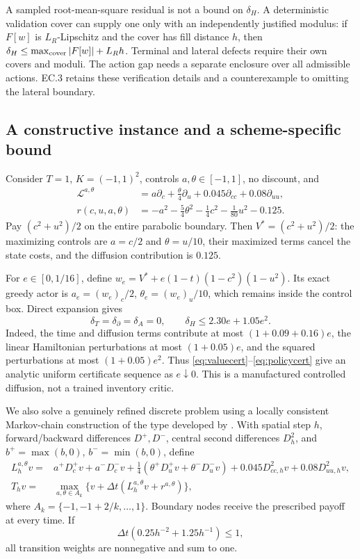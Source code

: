 A sampled root-mean-square residual is not a bound on $\delta_H$. A deterministic validation cover can supply one only with an independently justified modulus: if $F[w]$ is $L_R$-Lipschitz and the cover has fill distance $h$, then $\delta_H\leq\max_{\rm cover}|F[w]|+L_Rh$. Terminal and lateral defects require their own covers and moduli. The action gap needs a separate enclosure over all admissible actions. EC.3 retains these verification details and a counterexample to omitting the lateral boundary.

\subsection{A constructive instance and a scheme-specific bound}\label{sec:pde}
Consider $T=1$, $K=(-1,1)^2$, controls $a,\theta\in[-1,1]$, no discount, and
\begin{align}
 \mathcal L^{a,\theta}&=a\partial_c+\tfrac\theta4\partial_u
                     +0.045\partial_{cc}+0.08\partial_{uu},\label{eq:generator}\\
 r(c,u,a,\theta)&=-a^2-\tfrac54\theta^2-\tfrac14c^2-\tfrac1{80}u^2-0.125.\label{eq:pder}
\end{align}
Pay $(c^2+u^2)/2$ on the entire parabolic boundary. Then $V^*=(c^2+u^2)/2$: the maximizing controls are $a=c/2$ and $\theta=u/10$, their maximized terms cancel the state costs, and the diffusion contribution is $0.125$.

For $e\in[0,1/16]$, define $w_e=V^*+e(1-t)(1-c^2)(1-u^2)$. Its exact greedy actor is $a_e=(w_e)_c/2$, $\theta_e=(w_e)_u/10$, which remains inside the control box. Direct expansion gives
\begin{equation}\label{eq:analytic}
 \delta_T=\delta_\partial=\delta_A=0,\qquad
 \delta_H\leq2.30e+1.05e^2.
\end{equation}
Indeed, the time and diffusion terms contribute at most $(1+0.09+0.16)e$, the linear Hamiltonian perturbations at most $(1+0.05)e$, and the squared perturbations at most $(1+0.05)e^2$. Thus \eqref{eq:valuecert}--\eqref{eq:policycert} give an analytic uniform certificate sequence as $e\downarrow0$. This is a manufactured controlled diffusion, not a trained inventory critic.

We also solve a genuinely refined discrete problem using a locally consistent Markov-chain construction of the type developed by \citet{KushnerDupuis2001}. With spatial step $h$, forward/backward differences $D^+,D^-$, central second differences $D^2_h$, and $b^+=\max(b,0)$, $b^-=\min(b,0)$, define
\begin{align*}
 L_h^{a,\theta}v={}&a^+D_c^+v+a^-D_c^-v
    +\tfrac14(\theta^+D_u^+v+\theta^-D_u^-v)
    +0.045D_{cc,h}^2v+0.08D_{uu,h}^2v,\\
 T_hv={}&\max_{a,\theta\in A_k}\{v+\Delta t(L_h^{a,\theta}v+r^{a,\theta})\},
\end{align*}
where $A_k=\{-1,-1+2/k,\ldots,1\}$. Boundary nodes receive the prescribed payoff at every time. If
\begin{equation}\label{eq:cfl}
 \Delta t\left(0.25h^{-2}+1.25h^{-1}\right)\leq1,
\end{equation}
all transition weights are nonnegative and sum to one.


